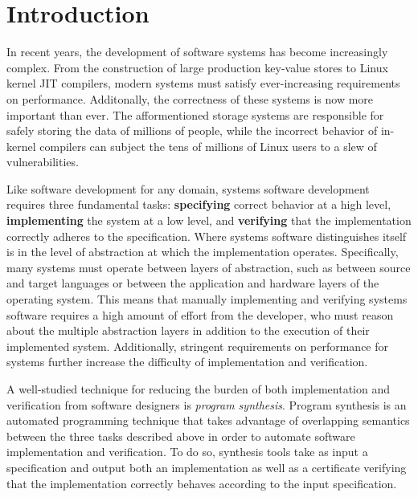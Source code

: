 \chapter{Introduction}

In recent years, the development of software systems has become increasingly
complex.
From the construction of large production key-value stores to Linux kernel JIT compilers,
modern systems must satisfy ever-increasing requirements on performance.
Additonally, the
correctness of these systems is now more important than ever. The
afformentioned storage systems are responsible for safely storing the data
of millions of people, while
the incorrect behavior of in-kernel compilers can subject the tens of millions of
Linux users to a slew of vulnerabilities.

Like software development for any domain, systems software development requires
three fundamental tasks:
\textbf{specifying} correct behavior at a high level,
\textbf{implementing} the system at a low level,
and \textbf{verifying} that the implementation correctly adheres to the specification.
Where systems software distinguishes itself is in the level of abstraction
at which the implementation operates.
Specifically, many systems must operate between layers of abstraction,
such as between source and target languages or between the application and
hardware layers of the operating system.
This means that manually implementing and verifying systems software requires
a high amount of effort from the developer, who must reason about the multiple abstraction
layers in addition to the execution of their implemented system.
Additionally, stringent requirements on performance for systems
further increase the difficulty of implementation and verification.

A well-studied technique for reducing the burden of both implementation
and verification from software designers is \textit{program synthesis}.
Program synthesis is an automated programming technique
that takes advantage of overlapping semantics between the three tasks described above
in order to automate software implementation and verification. 
To do so, synthesis tools take as input a specification and output both an implementation
as well as a certificate verifying that the implementation correctly behaves
according to the input specification.

